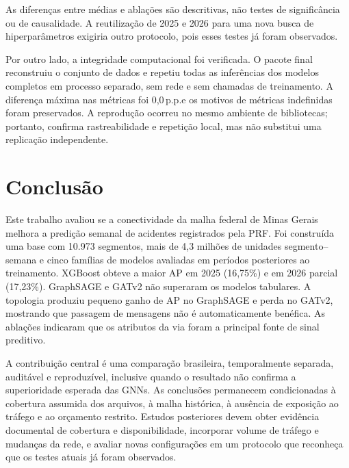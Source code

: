 \documentclass[12pt]{article}
\newcommand{\pp}{\,p.p.}
\begin{document}
As diferenças entre médias e ablações são descritivas, não testes de
significância ou de causalidade. A reutilização de 2025 e 2026 para uma
nova busca de hiperparâmetros exigiria outro protocolo, pois esses
testes já foram observados.

Por outro lado, a integridade computacional foi verificada. O pacote
final reconstruiu o conjunto de dados e repetiu todas as inferências
dos modelos completos em processo separado, sem rede e sem chamadas de
treinamento. A diferença máxima nas métricas foi 0,0\pp e os motivos de
métricas indefinidas foram preservados. A reprodução ocorreu no mesmo
ambiente de bibliotecas; portanto, confirma rastreabilidade e repetição
local, mas não substitui uma replicação independente.

\section{Conclusão}
\label{sec:conclusao}

Este trabalho avaliou se a conectividade da malha federal de Minas
Gerais melhora a predição semanal de acidentes registrados pela PRF.
Foi construída uma base com 10.973 segmentos, mais de 4,3 milhões de
unidades segmento--semana e cinco famílias de modelos avaliadas em
períodos posteriores ao treinamento. XGBoost obteve a maior AP em 2025
(16,75\%) e em 2026 parcial (17,23\%). GraphSAGE e GATv2 não superaram
os modelos tabulares. A topologia produziu pequeno ganho de AP no
GraphSAGE e perda no GATv2, mostrando que passagem de mensagens não é
automaticamente benéfica. As ablações indicaram que os atributos da via
foram a principal fonte de sinal preditivo.

A contribuição central é uma comparação brasileira, temporalmente
separada, auditável e reproduzível, inclusive quando o resultado não
confirma a superioridade esperada das GNNs. As conclusões permanecem
condicionadas à cobertura assumida dos arquivos, à malha histórica, à
ausência de exposição ao tráfego e ao orçamento restrito. Estudos
posteriores devem obter evidência documental de cobertura e
disponibilidade, incorporar volume de tráfego e mudanças da rede, e
avaliar novas configurações em um protocolo que reconheça que os testes
atuais já foram observados.


\end{document}
